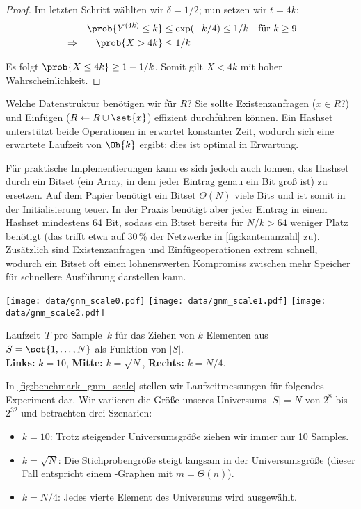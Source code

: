 \begin{proof}
    \noindent Im letzten Schritt wählten wir $\delta = 1/2$; nun setzen wir $t = 4k$:
    \begin{align}
         &             & \prob{Y^{(4k)} \le k} & \le \exp(-k/4) \le 1/k \quad \text{für } k \ge 9 \\
         & \Rightarrow & \prob{X > 4k}         & \le 1/k
    \end{align}

    \noindent
    Es folgt $\prob{X \le 4k} \ge 1 - 1/k$. Somit gilt $X < 4k$ mit hoher Wahrscheinlichkeit.
\end{proof}

Welche Datenstruktur benötigen wir für $R$? Sie sollte Existenzanfragen ($x \in R$?) und Einfügen ($R \gets R \cup \set{x}$) effizient durchführen können.
Ein Hashset unterstützt beide Operationen in erwartet konstanter Zeit, wodurch sich eine erwartete Laufzeit von $\Oh{k}$ ergibt; dies ist optimal in Erwartung.

Für praktische Implementierungen kann es sich jedoch auch lohnen, das Hashset durch ein Bitset (\dh ein Array, in dem jeder Eintrag genau ein Bit groß ist) zu ersetzen.
Auf dem Papier benötigt ein Bitset $\Theta(N)$ viele Bits und ist somit in der Initialisierung teuer.
In der Praxis benötigt aber jeder Eintrag in einem Hashset mindestens 64 Bit, sodass ein Bitset bereits für $N / k > 64$ weniger Platz benötigt (das trifft etwa auf 30\,\% der Netzwerke in \cref{fig:kantenanzahl} zu).
Zusätzlich sind Existenzanfragen und Einfügeoperationen extrem schnell, wodurch ein Bitset oft einen lohnenswerten Kompromiss zwischen mehr Speicher für schnellere Ausführung darstellen kann.

\begin{widefigure}
    \texttt{[image: data/gnm\_scale0.pdf]}\hfill
    \texttt{[image: data/gnm\_scale1.pdf]}\hfill
    \texttt{[image: data/gnm\_scale2.pdf]}

    \caption{
        Laufzeit~$T$ pro Sample~$k$ für das Ziehen von $k$ Elementen aus $S = \set{1, \ldots, N}$ als Funktion von $|S|$.\\
        \textbf{Links:} $k=10$, \textbf{Mitte: } $k = \sqrt{N}$, \textbf{Rechts: } $k = N / 4$.
    }
    \label{fig:benchmark_gnm_scale}
\end{widefigure}

In \cref{fig:benchmark_gnm_scale} stellen wir Laufzeitmessungen für folgendes Experiment dar.
Wir variieren die Größe unseres Universums $|S| = N$ von $2^8$ bis $2^{32}$ und betrachten drei Szenarien:
\begin{itemize}
    \item $k=10$: Trotz steigender Universumsgröße ziehen wir immer nur 10 Samples.
    \item $k=\sqrt{N}$: Die Stichprobengröße steigt langsam in der Universumsgröße (dieser Fall entspricht einem \Gnm-Graphen mit $m = \Theta(n)$).
    \item $k=N/4$: Jedes vierte Element des Universums wird ausgewählt.
\end{itemize}

